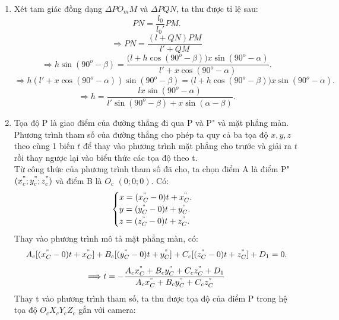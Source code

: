\begin{enumerate}[label=(\alph*)]
\item Xét tam giác đồng dạng $\Delta PO_mM$ và $\Delta PQN$, ta thu được tỉ lệ sau: \\
\begin{equation}
PN=\dfrac{l_0}{l_0'} PM.
\end{equation}
\begin{equation}
\Longrightarrow PN=\dfrac{(l+QN)PM}{l'+QM}
\end{equation}
\begin{equation}
\Longrightarrow  h\sin(90^o-\beta)=\dfrac{(l+h\cos{(90^o-\beta))x\sin{(90^o-\alpha)}}}{l'+x\cos{(90^o-\alpha)}}.
\end{equation}
\begin{equation}
\Longrightarrow h(l'+x\cos{(90^o-\alpha)})\sin(90^o-\beta)=(l+h\cos{(90^o-\beta))x\sin{(90^o-\alpha)}}.
\end{equation}
\begin{equation}
\boxed{
\Longrightarrow h=\dfrac{lx\sin{(90^o-\alpha)}}{l'\sin{(90^o-\beta)}+x\sin{(\alpha-\beta)}}.
}
\end{equation}
\item Tọa độ P là giao điểm của đường thẳng đi qua P và P" và mặt phẳng màn. Phương trình tham số của đường thẳng cho phép ta quy cả ba tọa độ $x, y, z$ theo cùng 1 biến $t$ để thay vào phương trình mặt phẳng cho trước và giải ra $t$ rồi thay ngược lại vào biểu thức các tọa độ theo t. \\
Từ công thức của phương trình tham số đã cho, ta chọn điểm A là điểm P" $(x^{"}_c; y^{"}_c; z^{"}_c)$ và điểm B là $O_c$ $(0; 0; 0)$. Có: 
\begin{equation}
   \begin{cases}
x = (x^{"}_C-0)t + x^{"}_C. \\
y = (y^{"}_C-0)t + y^{"}_C .\\
z = (z^{"}_C-0)t + z^{"}_C.
    \end{cases} 
\end{equation}
Thay vào phương trình mô tả mặt phẳng màn, có:
\begin{equation}
A_c[(x^{"}_C-0)t + x^{"}_C]+B_c[(y^{"}_C-0)t + y^{"}_C]+C_c[(z^{"}_C-0)t + z^{"}_C]+D_1=0.
\end{equation}
\begin{equation}
\Longrightarrow
t=-\dfrac{A_cx^{"}_C+B_cy^{"}_C+C_cz^{"}_C+D_1}{A_cx^{"}_C+B_cy^{"}_C+C_cz^{"}_C}
\end{equation}
Thay t vào phương trình tham số, ta thu được tọa độ của điểm P trong hệ tọa độ $O_cX_cY_cZ_c$ gắn với camera:


\end{enumerate}
